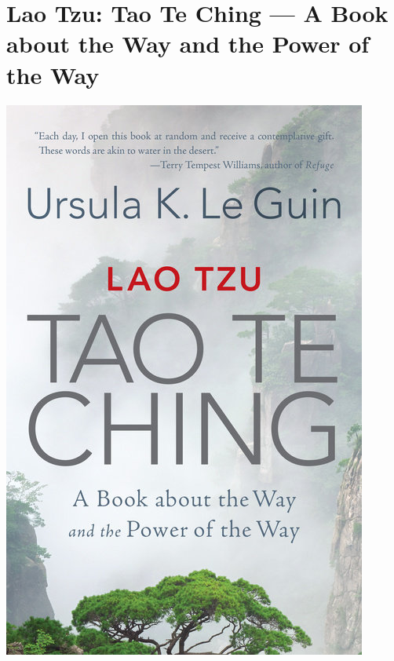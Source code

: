 \documentclass{tufte-handout}
\makeatletter
\newcommand{\varcaption}[2][0pt]{%
  \gsetlength{\@tufte@caption@vertical@offset}{-#1}%
  \gdef\@tufte@stored@varcaption{#2}%
}
\gdef\@tufte@stored@varcaption{} %
\makeatother
\begin{document}
\section*{Lao Tzu: Tao Te Ching --- A Book about the Way and the Power of the Way}
\begin{marginfigure}[9\baselineskip]
   \includegraphics[width=\linewidth]{images/tao_te_ching.jpg}
   \varcaption{\href{https://www.penguinrandomhouse.com/books/99496/lao-tzu-tao-te-ching-by-ursula-k-le-guin/9781611807240/}{Publisher Link}, \href{https://www.amazon.com/Lao-Tzu-Ching-about-Power/dp/1611807247/}{Amazon Link}}
\end{marginfigure}
\end{document}
